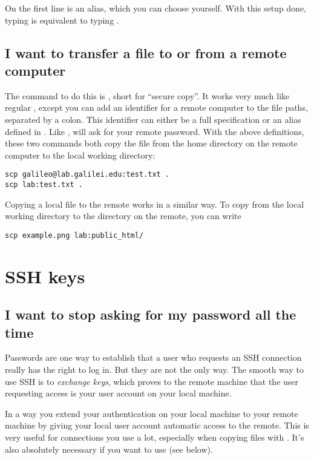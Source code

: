 On the first line  is an alias, which you can choose yourself. With
this setup done, typing  is equivalent to typing .

\subsection{I want to transfer a file to or from a remote computer}

The command to do this is , short for ``secure copy''. It works very
much like regular , except you can add an identifier for a remote
computer to the file paths, separated by a colon. This identifier can either be
a full  specification or an alias defined in
. Like ,  will ask for your remote password.
With the above definitions, these two commands both copy the file
 from the home directory on the remote computer to the local
working directory:

\begin{lstlisting}
scp galileo@lab.galilei.edu:test.txt .
scp lab:test.txt .
\end{lstlisting}

Copying a local file to the remote works in a similar way. To copy
 from the local working directory to the 
directory on the remote, you can write

\begin{lstlisting}
scp example.png lab:public_html/
\end{lstlisting}

\section{SSH keys}

\subsection{I want to stop  asking for my password all the time}

Passwords are one way to establish that a user who requests an SSH connection
really has the right to log in. But they are not the only way. The smooth way
to use SSH is to \emph{exchange keys}, which proves to the remote machine that
the user requesting access is your user account on your local machine.

In a way you extend your authentication on your local machine to your remote
machine by giving your local user account automatic access to the remote. This
is very useful for connections you use a lot, especially when copying files
with . It's also absolutely necessary if you want to use 
(see below).

